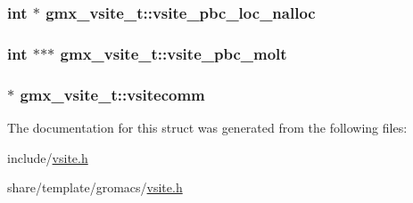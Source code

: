 \hypertarget{structgmx__vsite__t_a1492be75f3b0dfcfd8e3fa78368604eb}{
\subsubsection[{vsite\-\_\-pbc\-\_\-loc\-\_\-nalloc}]{\setlength{\rightskip}{0pt plus 5cm}int $\ast$ {\bf gmx\-\_\-vsite\-\_\-t\-::vsite\-\_\-pbc\-\_\-loc\-\_\-nalloc}}}\label{structgmx__vsite__t_a1492be75f3b0dfcfd8e3fa78368604eb}
\hypertarget{structgmx__vsite__t_a5b697ae06c17d7e63e0c1d2c63c057dc}{
\subsubsection[{vsite\-\_\-pbc\-\_\-molt}]{\setlength{\rightskip}{0pt plus 5cm}int $\ast$$\ast$$\ast$ {\bf gmx\-\_\-vsite\-\_\-t\-::vsite\-\_\-pbc\-\_\-molt}}}\label{structgmx__vsite__t_a5b697ae06c17d7e63e0c1d2c63c057dc}
\hypertarget{structgmx__vsite__t_a852ccf2c4fe1779d69ba59377dc33550}{
\subsubsection[{vsitecomm}]{ $\ast$ {\bf gmx\-\_\-vsite\-\_\-t\-::vsitecomm}}}\label{structgmx__vsite__t_a852ccf2c4fe1779d69ba59377dc33550}


\-The documentation for this struct was generated from the following files\-:\begin{DoxyCompactItemize}
\item 
include/\hyperlink{include_2vsite_8h}{vsite.\-h}\item 
share/template/gromacs/\hyperlink{share_2template_2gromacs_2vsite_8h}{vsite.\-h}\end{DoxyCompactItemize}

